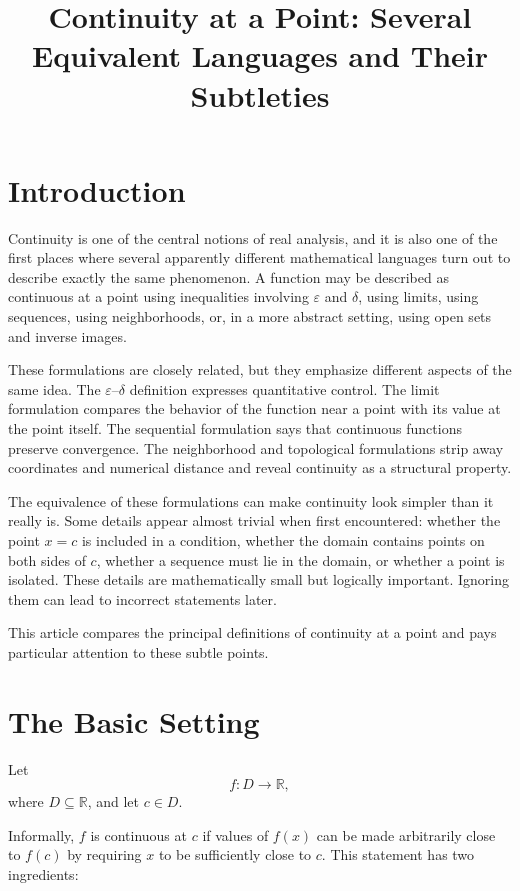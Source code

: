 \documentclass{essay}
\title{Continuity at a Point: Several Equivalent Languages and Their Subtleties}
\author{}
\date{}
\begin{document}
\maketitle

\section{Introduction}

Continuity is one of the central notions of real analysis, and it is also one of the first places where several apparently different mathematical languages turn out to describe exactly the same phenomenon. A function may be described as continuous at a point using inequalities involving $\varepsilon$ and $\delta$, using limits, using sequences, using neighborhoods, or, in a more abstract setting, using open sets and inverse images.

These formulations are closely related, but they emphasize different aspects of the same idea. The $\varepsilon$--$\delta$ definition expresses quantitative control. The limit formulation compares the behavior of the function near a point with its value at the point itself. The sequential formulation says that continuous functions preserve convergence. The neighborhood and topological formulations strip away coordinates and numerical distance and reveal continuity as a structural property.

The equivalence of these formulations can make continuity look simpler than it really is. Some details appear almost trivial when first encountered: whether the point $x=c$ is included in a condition, whether the domain contains points on both sides of $c$, whether a sequence must lie in the domain, or whether a point is isolated. These details are mathematically small but logically important. Ignoring them can lead to incorrect statements later.

This article compares the principal definitions of continuity at a point and pays particular attention to these subtle points.

\section{The Basic Setting}

Let
\[
f:D\to\mathbb{R},
\]
where $D\subseteq\mathbb{R}$, and let $c\in D$.

Informally, $f$ is continuous at $c$ if values of $f(x)$ can be made arbitrarily close to $f(c)$ by requiring $x$ to be sufficiently close to $c$. This statement has two ingredients:
\end{document}

